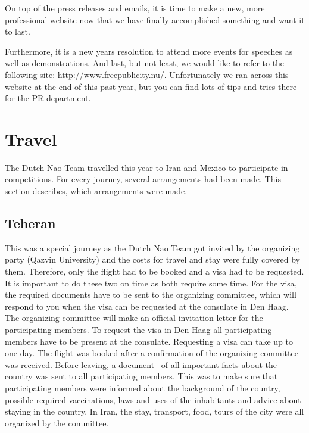 \documentclass[11pt,a4paper,oneside]{article}
\begin{document}
On top of the press releases and emails, it is time to make a new, more professional website now that we have finally accomplished something and want it to last.

Furthermore, it is a new years resolution to attend more events for speeches as well as demonstrations.
And last, but not least, we would like to refer to the following site: \url{http://www.freepublicity.nu/}. Unfortunately we ran across this website at the end of this past year, but you can find lots of tips and trics there for the PR department.

\section{Travel}
The Dutch Nao Team travelled this year to Iran and Mexico to participate in competitions. For every journey, several arrangements had been made. This section describes, which arrangements were made.


\subsection{Teheran}
This was a special journey as the Dutch Nao Team got invited by the organizing party (Qazvin University) and the costs for travel and stay were fully covered by them. Therefore, only the flight had to be booked and a visa had to be requested. It is important to do these two on time as both require some time. For the visa, the required documents have to be sent to the organizing committee, which will respond to you when the visa can be requested at the consulate in Den Haag. The organizing committee will make an official invitation letter for the participating members. To request the visa in Den Haag all participating members have to be present at the consulate. Requesting a visa can take up to one day. The flight was booked after a confirmation of the organizing committee was received. Before leaving, a document~\cite{Verschoor2012Iran} of all important facts about the country was sent to all participating members. This was to make sure that participating members were informed about the background of the country, possible required vaccinations, laws and uses of the inhabitants and advice about staying in the country. In Iran, the stay, transport, food, tours of the city were all organized by the committee. 
\end{document}
